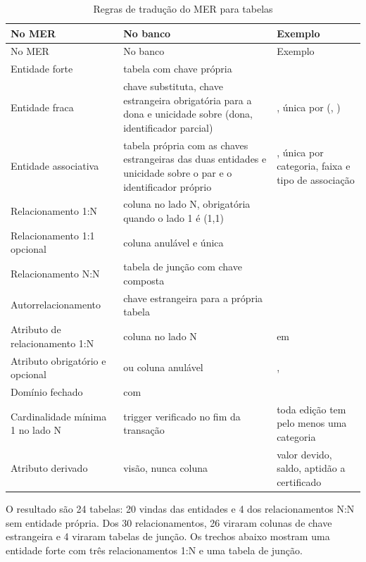 \begin{longtable}{@{}L{3.4cm} L{5.9cm} L{4.7cm}@{}}
\caption{Regras de tradução do MER para tabelas}\label{tab:traducao}\\
\toprule
No MER & No banco & Exemplo\\
\midrule
\endfirsthead
\toprule
No MER & No banco & Exemplo\\
\midrule
\endhead
\bottomrule
\endfoot
Entidade forte & tabela com chave própria  & \\
Entidade fraca & chave substituta, chave estrangeira obrigatória para a dona e unicidade sobre (dona, identificador parcial) & , única por (, )\\
Entidade associativa & tabela própria com as chaves estrangeiras das duas entidades e unicidade sobre o par e o identificador próprio & , única por categoria, faixa e tipo de associação\\
Relacionamento 1:N & coluna  no lado N, obrigatória quando o lado 1 é (1,1) & \\
Relacionamento 1:1 opcional & coluna  anulável e única & \\
Relacionamento N:N & tabela de junção com chave composta & \\
Autorrelaciona\-mento & chave estrangeira para a própria tabela & \\
Atributo de relacionamento 1:N & coluna no lado N &  em \\
Atributo obrigatório e opcional &  ou coluna anulável & , \\
Domínio fechado &  com  & \\
Cardinalidade mínima 1 no lado N & trigger verificado no fim da transação & toda edição tem pelo menos uma categoria\\
Atributo derivado & visão, nunca coluna & valor devido, saldo, aptidão a certificado\\
\end{longtable}

O resultado são 24 tabelas: 20 vindas das entidades e 4 dos relacionamentos N:N sem entidade própria. Dos 30 relacionamentos, 26 viraram colunas de chave estrangeira e 4 viraram tabelas de junção. Os trechos abaixo mostram uma entidade forte com três relacionamentos 1:N e uma tabela de junção.

